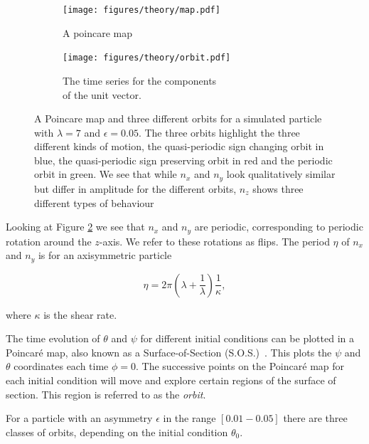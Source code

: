 \begin{figure}[H]
\centering
\begin{subfigure}[b]{0.45\textwidth}
\texttt{[image: figures/theory/map.pdf]}
\caption{A poincare map}\label{fig:orbitmap}
\end{subfigure}\hspace{1em}%
\begin{subfigure}[b]{0.5\textwidth}
\texttt{[image: figures/theory/orbit.pdf]}
\caption{The time series for the components \\ of the unit vector.}\label{fig:orbitparams}
\end{subfigure}
\caption{A Poincare map and three different orbits for a simulated particle with $\lambda=7$ and $\epsilon=0.05$. The three orbits highlight the three different kinds of motion, the quasi-periodic sign changing orbit in blue, the quasi-periodic sign preserving orbit in red and the periodic orbit in green. We see that while $n_x$ and $n_y$ look qualitatively similar but differ in amplitude for the different orbits, $n_z$ shows three different types of behaviour}
\label{fig:orbittypes}
\end{figure}



Looking at Figure \ref{fig:orbitparams} we see that $n_x$ and $n_y$ are periodic, corresponding to periodic rotation around the $z$-axis. We refer to these rotations as flips. The period $\eta$ of $n_x$ and $n_y$ is for an axisymmetric particle \cite{Jeffery}

\begin{equation}\label{eq:flipRate}
\eta = 2\pi \left( \lambda + \frac{1}{\lambda} \right)\frac{1}{\kappa},
\end{equation}

\noindent where $\kappa$ is the shear rate. 

The time evolution of $\theta$ and $\psi$ for different initial conditions can be plotted in a Poincaré map, also known as a Surface-of-Section (S.O.S.)~\cite{poincare}. This plots the $\psi$ and $\theta$ coordinates each time $\phi = 0$. The successive points on the Poincaré map for each initial condition will move and explore certain regions of the surface of section. This region is referred to as the \emph{orbit}. 

For a particle with an asymmetry $\epsilon$ in the range $\left[0.01-0.05\right]$ there are three classes of orbits, depending on the initial condition $\theta_0$.

